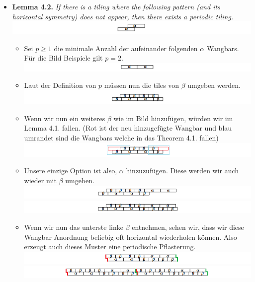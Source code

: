 \begin{itemize}
    \item \textbf{Lemma 4.2.} {\itshape If there is a tiling where the following pattern (and its horizontal symmetry) does not appear, then there exists a periodic tiling.}
    \\ \includegraphics[width=\textwidth]{src/pics/2.png}
    \begin{itemize}
        \item Sei $p \geq 1$ die minimale Anzahl der aufeinander folgenden $\alpha$ Wangbars. \\Für die Bild Beispiele gilt $p = 2$.
        \\ \includegraphics[width=\textwidth]{src/pics/3.png}
        \item Laut der Definition von $p$ müssen nun die tiles von $\beta$ umgeben werden.
        \\ \includegraphics[width=\textwidth]{src/pics/4.png}
        \item Wenn wir nun ein weiteres $\beta$ wie im Bild hinzufügen, würden wir im Lemma 4.1. fallen. (Rot ist der neu hinzugefügte Wangbar und blau umrandet sind die Wangbars welche in das Theorem 4.1. fallen)
        \\ \includegraphics[width=\textwidth]{src/pics/5.png}
        \item Unsere einzige Option ist also, $\alpha$ hinzuzufügen. Diese werden wir auch wieder mit $\beta$ umgeben.
        \\ \includegraphics[width=\textwidth]{src/pics/6.png}
        \\ \includegraphics[width=\textwidth]{src/pics/7.png}
        \item Wenn wir nun das unterste linke $\beta$ entnehmen, sehen wir, dass wir diese Wangbar Anordnung beliebig oft horizontal wiederholen können. Also erzeugt auch dieses Muster eine periodische Pflasterung. 
        \\ \includegraphics[width=\textwidth]{src/pics/8_2.png} 
        \\ \includegraphics[width=\textwidth]{src/pics/8_3.png} 
    \end{itemize}    
    

\end{itemize}
